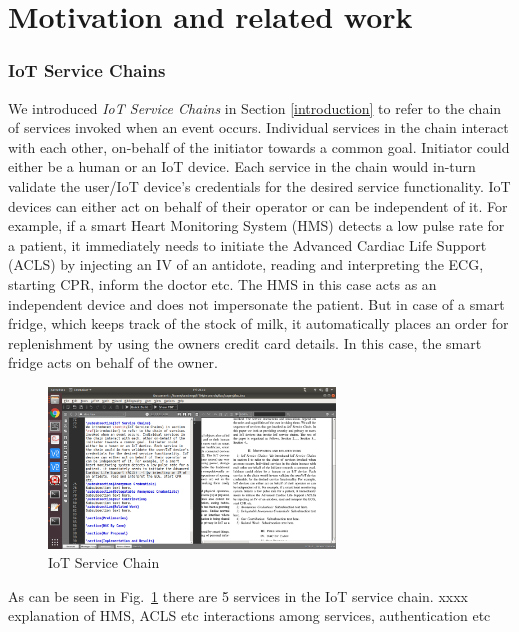\documentclass[journal]{IEEEtran}
\begin{document}
\section{Motivation and related work} \label{motivation}

\subsubsection{IoT Service Chains} \label{iotsvcch}
We introduced \textit{IoT Service Chains} in Section \ref{introduction} to refer to the chain of services invoked when an event occurs. Individual services in the chain interact with each other, on-behalf of the initiator towards a common goal. Initiator could either be a human or an IoT device. Each service in the chain would in-turn validate the user/IoT device's credentials for the desired service functionality. IoT devices can either act on behalf of their operator or can be independent of it. For example, if a smart Heart Monitoring System (HMS) detects a low pulse rate for a patient, it immediately needs to initiate the Advanced Cardiac Life Support (ACLS) by injecting an IV of an antidote, reading and interpreting the ECG, starting CPR, inform the doctor etc. The HMS in this case acts as an independent device and does not impersonate the patient. But in case of a smart fridge, which keeps track of the stock of milk, it automatically places an order for replenishment by using the owners credit card details. In this case, the smart fridge acts on behalf of the owner.

\begin{figure}[htbp]
\centerline{\includegraphics[width=3in]{dac.png}}
\caption{IoT Service Chain}
\label{fig:iotsvc}
\end{figure}

As can be seen in Fig.~\ref{fig:iotsvc} there are 5 services in the IoT service chain. xxxx explanation of HMS, ACLS etc interactions among services, authentication etc
\end{document}
